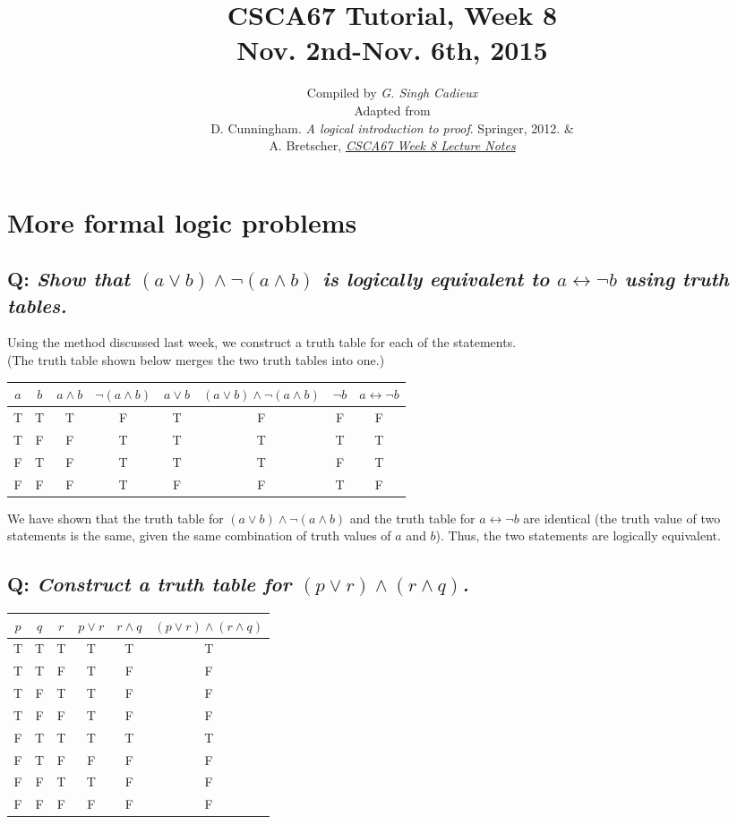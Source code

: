 \documentclass{article}
\title{\sc\LARGE CSCA67 Tutorial, Week 8\\
{\Large Nov. 2nd-Nov. 6th, 2015}}
\date{}
\author{\sc Compiled by {\em G. Singh Cadieux}\\[1ex]
\sc Adapted from\\
D. Cunningham. \textit{A logical introduction to proof}. Springer, 2012. \&\\
A. Bretscher, \href{http://www.utsc.utoronto.ca/~bretscher/a67/lectures/predicates.pdf}{\em CSCA67 Week 8 Lecture Notes}}
\begin{document}
\maketitle

\section{\sc More formal logic problems}

\subsection*{Q: {\em Show that $(a\vee b)\wedge\neg(a\wedge b)$ is logically equivalent to $a\leftrightarrow \neg b$ using truth tables.}}
Using the method discussed last week, we construct a truth table for each of the statements.\\
(The truth table shown below merges the two truth tables into one.)
\begin{center}
\begin{tabular}{cc|c|c|c|c||c|c}
$a$&$b$&$a\wedge b$&$\neg(a\wedge b)$&$a\vee b$&$(a\vee b)\wedge\neg(a\wedge b)$&$\neg b$&$a\leftrightarrow \neg b$\\\hline
T&T&T&F&T&F&F&F\\
T&F&F&T&T&T&T&T\\
F&T&F&T&T&T&F&T\\
F&F&F&T&F&F&T&F
\end{tabular}
\end{center}
We have shown that the truth table for $(a\vee b)\wedge\neg(a\wedge b)$ and the truth table for $a\leftrightarrow \neg b$ are identical (the truth value of two statements is the same, given the same combination of truth values of $a$ and $b$). Thus, the two statements are logically equivalent.

\subsection*{Q: {\em Construct a truth table for $(p\vee r)\wedge(r\wedge q)$.}}
\begin{center}
\begin{tabular}{ccc|c|c|c}
$p$&$q$&$r$&$p\vee r$&$r\wedge q$&$(p\vee r)\wedge(r\wedge q)$\\\hline
T&T&T&T&T&T\\
T&T&F&T&F&F\\
T&F&T&T&F&F\\
T&F&F&T&F&F\\
F&T&T&T&T&T\\
F&T&F&F&F&F\\
F&F&T&T&F&F\\
F&F&F&F&F&F
\end{tabular}
\end{center}
\end{document}
